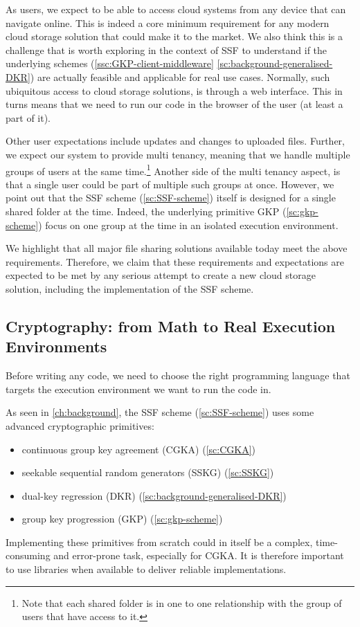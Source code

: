 As users, we expect to be able to access 
cloud systems from any device that can navigate online.
This is indeed a core minimum requirement for any modern
cloud storage solution that could make it to the market.
We also think this is a challenge that is worth exploring
in the context of SSF to understand if the underlying
schemes (\cref{ssc:GKP-client-middleware} \cref{sc:background-generalised-DKR})
are actually feasible and applicable for real use cases.
Normally, such ubiquitous access to cloud storage solutions,
is through a web interface.
This in turns means that we need to run our code in the
browser of the user (at least a part of it).

Other user expectations include updates and changes to uploaded files.
Further, we expect our system to provide multi tenancy,
meaning that we handle multiple groups of users at the same time.\footnote{Note that each shared folder is in one to one relationship with the group of users that have access to it.} 
Another side of the multi tenancy aspect, is that a 
single user could be part of multiple such groups at once. 
However, we point out that the SSF scheme (\cref{sc:SSF-scheme}) 
itself is designed for a single shared folder at the time.
Indeed, the underlying primitive GKP (\cref{sc:gkp-scheme}) focus 
on one group at the time in an isolated execution environment.

We highlight that all major file sharing solutions available today meet the above requirements.
Therefore, we claim that these requirements and expectations are expected to be met by any serious attempt to create a new cloud storage solution, including the implementation of the SSF scheme.

\subsection{Cryptography: from Math to Real Execution Environments}\label{sc:abstract-to-real}

Before writing any code, we need to choose the right 
programming language that targets the execution environment
we want to run the code in.

As seen in \cref{ch:background}, the SSF scheme (\cref{sc:SSF-scheme})
uses some advanced cryptographic primitives:
\begin{itemize}
    \item continuous group key agreement (CGKA) (\cref{sc:CGKA})
    \item seekable sequential random generators (SSKG) (\cref{sc:SSKG})
    \item dual-key regression (DKR) (\cref{sc:background-generalised-DKR})
    \item group key progression (GKP) (\cref{sc:gkp-scheme})
\end{itemize}
Implementing these primitives from scratch could in itself
be a complex, time-consuming and error-prone task, especially for CGKA.
It is therefore important to use libraries when available
to deliver reliable implementations.

